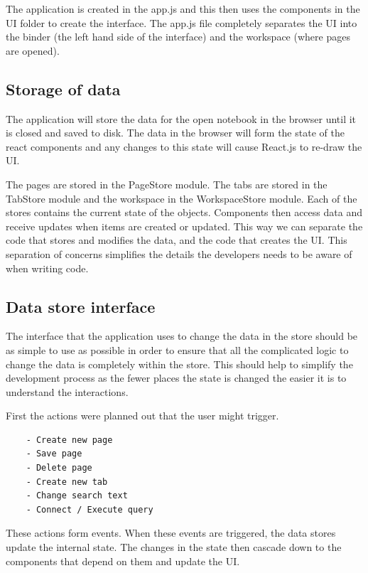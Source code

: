 The application is created in the app.js and this then uses the
components in the UI folder to create the interface. The app.js file
completely separates the UI into the binder (the left hand side of the
interface) and the workspace (where pages are opened).

\subsection{Storage of data}\label{storage-of-data}

The application will store the data for the open notebook in the browser
until it is closed and saved to disk. The data in the browser will form
the state of the react components and any changes to this state will
cause React.js to re-draw the UI.

The pages are stored in the PageStore module. The tabs are stored in the
TabStore module and the workspace in the WorkspaceStore module. Each of the
stores contains the current state of the objects. Components then access data
and receive updates when items are created or updated.  This way we can
separate the code that stores and modifies the data, and the code that
creates the UI. This separation of concerns simplifies the details the
developers needs to be aware of when writing code.

\subsection{Data store interface}\label{data-store-interface}

The interface that the application uses to change the data in the store should 
be as simple to use as possible in order to ensure that all the complicated 
logic to change the data is completely within the store. This should help to 
simplify the development process as the fewer places the state is changed 
the easier it is to understand the interactions.

First the actions were planned out that the user might trigger.

\begin{verbatim}
    - Create new page 
    - Save page 
    - Delete page 
    - Create new tab 
    - Change search text
    - Connect / Execute query
\end{verbatim}

These actions form events. When these events are triggered, the data stores
update the internal state. The changes in the state then cascade down to the
components that depend on them and update the UI.

